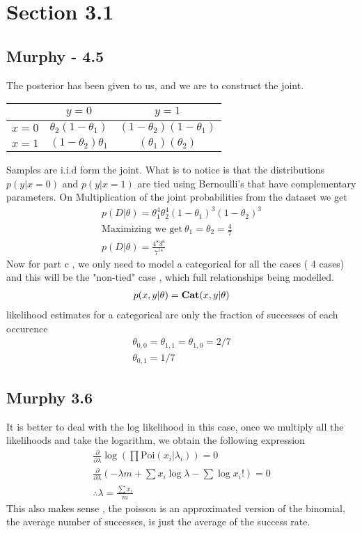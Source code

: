 \section{Section 3.1}
\subsection{Murphy - 4.5}
The posterior has been given to us, and we are to construct the joint.
\begin{center}
\begin{tabular}{c|c|c}
      &  $y = 0$  & $y = 1$ \\
     \hline
     $x  = 0$ &  $\theta_2(1 - \theta_1)$ & $(1 - \theta_2)(1 - \theta_1)$ \\
     \hline
     $x = 1$ &  $(1 - \theta_2)\theta_1$ &  $(\theta_1)( \theta_2)$ \\
     \hline
\end{tabular}
\end{center}
Samples are i.i.d form the joint. What is to notice is that the distributions 
$p(y| x = 0)$ and $p(y | x = 1)$ are tied using Bernoulli's that have complementary parameters.
On Multiplication  of the joint probabilities from the dataset we get 
\begin{gather}
    p(D | \theta) = \theta_1^4 \theta_2^4 (1  -  \theta_1)^3  ( 1 - \theta_2)^3
    \\
    \text{Maximizing we get} \ \theta_1 = \theta_2 = \frac{4}{7}
    \\
    p(D | \theta) = \frac{4^8 3^6}{7^{14}}
\end{gather}
Now for part c , we only need to model a categorical for all the cases ( 4 cases) and this
will be the "non-tied" case , which full relationships being modelled.
\begin{gather}
    p(x, y | \theta) = \textbf{Cat}(x , y | \vb{\theta})
    \\
\end{gather}
likelihood estimates for a categorical are only the fraction of successes of each occurence
\begin{gather}
    \theta_{0,0}  = \theta_{1,1} = \theta_{1, 0} = 2/7 \\
    \theta_{0,1} = 1/7
\end{gather}

\subsection{Murphy 3.6}
It is better to deal with the log likelihood in this case, once we multiply all the likelihoods and take the logarithm, we obtain the following expression
\begin{gather}
    \frac{\partial}{\partial \lambda} \log (\prod \text{Poi} (x_i | \lambda_i)) = 0 \\
    \frac{\partial}{\partial \lambda}(-\lambda m + \sum x_i \log \lambda  - \sum \log x_i! ) = 0 \\
    \therefore \lambda = \frac{\sum x_i}{m}
\end{gather}
This also makes sense , the poisson is an approximated version of the binomial, the average number of successes, is just the average of the success rate.


